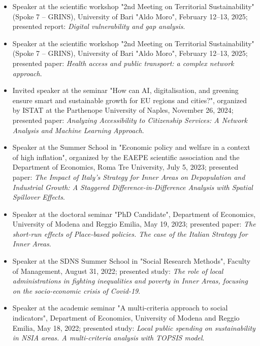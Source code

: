 \documentclass[11pt,a4paper,sans]{moderncv} %
\begin{document}
\begin{itemize}
    
    \item Speaker at the scientific workshop "2nd Meeting on Territorial Sustainability" (Spoke 7 – GRINS), University of Bari "Aldo Moro", February 12–13, 2025; presented report: \textit{Digital vulnerability and gap analysis}.
    \item Speaker at the scientific workshop "2nd Meeting on Territorial Sustainability" (Spoke 7 – GRINS), University of Bari "Aldo Moro", February 12–13, 2025; presented paper: \textit{Health access and public transport: a complex network approach}.

    \item Invited speaker at the seminar "How can AI, digitalisation, and greening ensure smart and sustainable growth for EU regions and cities?", organized by ISTAT at the Parthenope University of Naples, November 26, 2024; presented paper: \textit{Analyzing Accessibility to Citizenship Services: A Network Analysis and Machine Learning Approach}.

    
    \item Speaker at the Summer School in "Economic policy and welfare in a context of high inflation", organized by the EAEPE scientific association and the Department of Economics, Roma Tre University, July 5, 2023; presented paper: \textit{The Impact of Italy's Strategy for Inner Areas on Depopulation and Industrial Growth: A Staggered Difference-in-Difference Analysis with Spatial Spillover Effects}.
    \item Speaker at the doctoral seminar "PhD Candidate", Department of Economics, University of Modena and Reggio Emilia, May 19, 2023; presented paper: \textit{The short-run effects of Place-based policies. The case of the Italian Strategy for Inner Areas}.
    \item Speaker at the SDNS Summer School in "Social Research Methods", Faculty of Management, August 31, 2022; presented study: \textit{The role of local administrations in fighting inequalities and poverty in Inner Areas, focusing on the socio-economic crisis of Covid-19}.
    \item Speaker at the academic seminar "A multi-criteria approach to social indicators", Department of Economics, University of Modena and Reggio Emilia, May 18, 2022; presented study: \textit{Local public spending on sustainability in NSIA areas. A multi-criteria analysis with TOPSIS model}.
\end{itemize}
\end{document}

